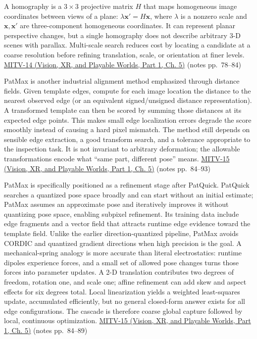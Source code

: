 A homography is a \(3\times3\) projective matrix \(H\) that maps homogeneous image coordinates between views of a plane: \(\lambda\mathbf{x}'=H\mathbf{x}\), where \(\lambda\) is a nonzero scale and \(\mathbf{x},\mathbf{x}'\) are three-component homogeneous coordinates. It can represent planar perspective changes, but a single homography does not describe arbitrary 3-D scenes with parallax. Multi-scale search reduces cost by locating a candidate at a coarse resolution before refining translation, scale, or orientation at finer levels. \href{../07-Vision-XR-and-Playable-Worlds-P01/main.pdf\#nameddest=04-visual-computing-ii-ch036-mitv-14---inspection-in-patquick-hough-transform-homography-position-determination-multi-scale}{MITV-14 (Vision, XR, and Playable Worlds, Part 1, Ch. 5)} (notes pp.~78--84)

PatMax is another industrial alignment method emphasized through distance fields. Given template edges, compute for each image location the distance to the nearest observed edge (or an equivalent signed/unsigned distance representation). A transformed template can then be scored by summing those distances at its expected edge points. This makes small edge localization errors degrade the score smoothly instead of causing a hard pixel mismatch. The method still depends on sensible edge extraction, a good transform search, and a tolerance appropriate to the inspection task. It is not invariant to arbitrary deformation; the allowable transformations encode what ``same part, different pose'' means. \href{../07-Vision-XR-and-Playable-Worlds-P01/main.pdf\#nameddest=04-visual-computing-ii-ch036-mitv-15---alignment-patmax-distance-field-filtering-and-sub-sampling-us-7065262}{MITV-15 (Vision, XR, and Playable Worlds, Part 1, Ch. 5)} (notes pp.~84--93)

PatMax is specifically positioned as a refinement stage after PatQuick. PatQuick searches a quantized pose space broadly and can start without an initial estimate; PatMax assumes an approximate pose and iteratively improves it without quantizing pose space, enabling subpixel refinement. Its training data include edge fragments and a vector field that attracts runtime edge evidence toward the template field. Unlike the earlier direction-quantized pipeline, PatMax avoids CORDIC and quantized gradient directions when high precision is the goal. A mechanical-spring analogy is more accurate than literal electrostatics: runtime dipoles experience forces, and a small set of allowed pose changes turns those forces into parameter updates. A 2-D translation contributes two degrees of freedom, rotation one, and scale one; affine refinement can add skew and aspect effects for six degrees total. Local linearization yields a weighted least-squares update, accumulated efficiently, but no general closed-form answer exists for all edge configurations. The cascade is therefore coarse global capture followed by local, continuous optimization. \href{../07-Vision-XR-and-Playable-Worlds-P01/main.pdf\#nameddest=04-visual-computing-ii-ch036-mitv-15---alignment-patmax-distance-field-filtering-and-sub-sampling-us-7065262}{MITV-15 (Vision, XR, and Playable Worlds, Part 1, Ch. 5)} (notes pp.~84--89)

